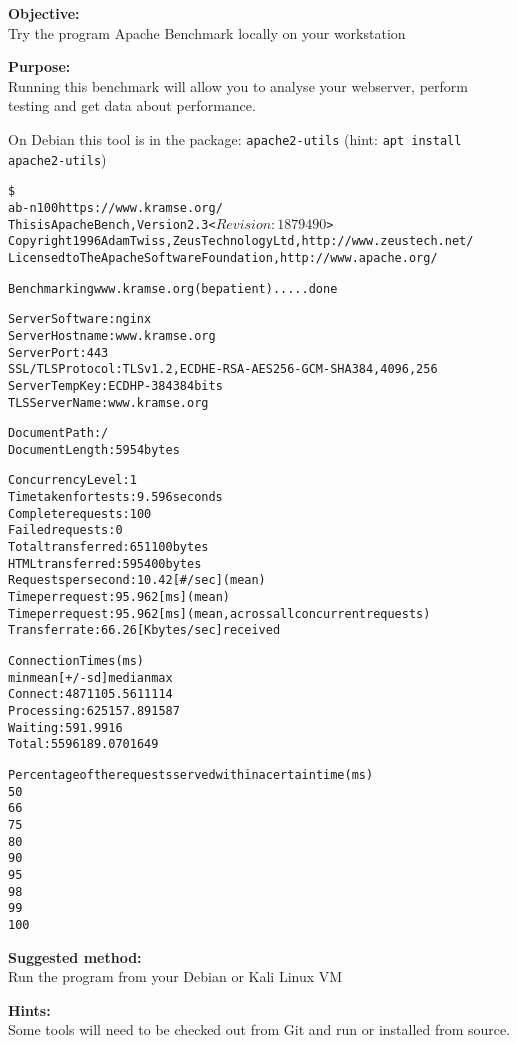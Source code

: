 \documentclass[a4paper,11pt,notitlepage]{report}
\begin{document}
{\bf Objective:}\\
Try the program Apache Benchmark locally on your workstation


{\bf Purpose:}\\
Running this benchmark will allow you to analyse your webserver, perform testing and get data about performance.

On Debian this tool is in the package: \verb+apache2-utils+ (hint:  \verb+apt install apache2-utils+)

\begin{alltt}\footnotesize
\$
ab -n 100 https://www.kramse.org/
This is ApacheBench, Version 2.3 <$Revision: 1879490 $>
Copyright 1996 Adam Twiss, Zeus Technology Ltd, http://www.zeustech.net/
Licensed to The Apache Software Foundation, http://www.apache.org/

Benchmarking www.kramse.org (be patient).....done


Server Software:        nginx
Server Hostname:        www.kramse.org
Server Port:            443
SSL/TLS Protocol:       TLSv1.2,ECDHE-RSA-AES256-GCM-SHA384,4096,256
Server Temp Key:        ECDH P-384 384 bits
TLS Server Name:        www.kramse.org

Document Path:          /
Document Length:        5954 bytes

Concurrency Level:      1
Time taken for tests:   9.596 seconds
Complete requests:      100
Failed requests:        0
Total transferred:      651100 bytes
HTML transferred:       595400 bytes
Requests per second:    10.42 [#/sec] (mean)
Time per request:       95.962 [ms] (mean)
Time per request:       95.962 [ms] (mean, across all concurrent requests)
Transfer rate:          66.26 [Kbytes/sec] received

Connection Times (ms)
              min  mean[+/-sd] median   max
Connect:       48   71 105.5     61    1114
Processing:     6   25 157.8      9    1587
Waiting:        5    9   1.9      9      16
Total:         55   96 189.0     70    1649

Percentage of the requests served within a certain time (ms)
  50%     70
  66%     72
  75%     73
  80%     74
  90%     76
  95%     78
  98%   1124
  99%   1649
 100%   1649 (longest request)
\end{alltt}


{\bf Suggested method:}\\
Run the program from your Debian or Kali Linux VM


{\bf Hints:}\\
Some tools will need to be checked out from Git and run or installed from source.
\end{document}
